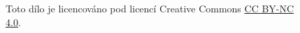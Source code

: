 \documentclass[10pt,a4paper]{article}
\date{\today}
\author{Jakub Rádl}
\makeatletter
\let\thetitle\@title
\makeatother
\begin{document}
\maketitle
\tableofcontents
\begin{figure}[b]
Toto dílo \textit{\thetitle} je licencováno pod licencí Creative Commons \href{https://creativecommons.org/licenses/by-nc/4.0/}{CC BY-NC 4.0}.
\end{figure}
\newpage
\end{document}
